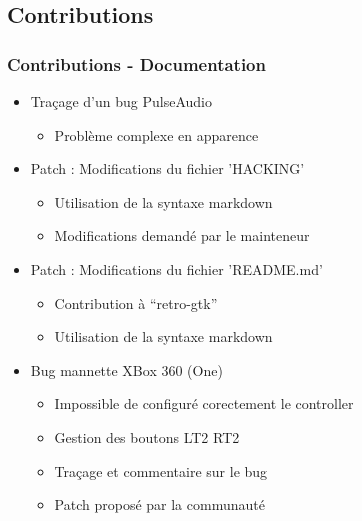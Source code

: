 \documentclass{beamer}
\begin{document}
\subsection{Contributions}
\begin{frame}
  \frametitle{Contributions - Documentation}
  \begin{itemize}
  \item Traçage d'un bug PulseAudio
    \begin{itemize}
      \item Problème complexe en apparence
    \end{itemize}
  \item Patch : Modifications du fichier 'HACKING'
    \begin{itemize}
    \item Utilisation de la syntaxe markdown
    \item Modifications demandé par le mainteneur
    \end{itemize}
  \item Patch : Modifications du fichier 'README.md'
    \begin{itemize}
    \item Contribution à ``retro-gtk''
    \item Utilisation de la syntaxe markdown
    \end{itemize}
  \item Bug mannette XBox 360 (One)
    \begin{itemize}
    \item Impossible de configuré corectement le controller
    \item Gestion des boutons LT2 RT2
    \item Traçage et commentaire sur le bug
    \item Patch proposé par la communauté
    \end{itemize}
  \end{itemize}
\end{frame}
\end{document}
